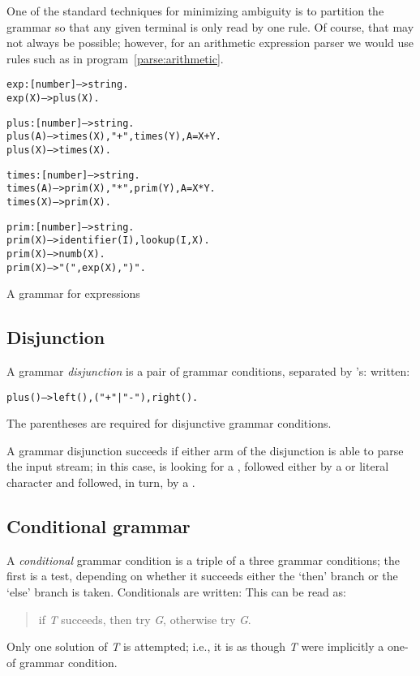 \begin{aside}
One of the standard techniques for minimizing ambiguity is to partition the grammar so that any given terminal is only read by one rule. Of course, that may not always be possible; however, for an arithmetic expression parser we would use rules such as in program~\vref{parse:arithmetic}.
\end{aside}
\begin{program}
\vspace{0.5ex}
\begin{alltt}
exp:[number]-->string.
exp(X) --> plus(X).

plus:[number]-->string.
plus(A) --> times(X), "+", times(Y), A=X+Y.
plus(X) --> times(X).

times:[number]-->string.
times(A) --> prim(X), "*", prim(Y), A=X*Y.
times(X) --> prim(X).

prim:[number]-->string.
prim(X) --> identifier(I), {lookup(I,X)}.
prim(X) --> numb(X).
prim(X) --> "(",exp(X),")".
\end{alltt}
\vspace{-2ex}
\caption{A grammar for expressions}\label{parse:arithmetic}
\end{program}

\subsection{Disjunction}
\label{grammar:disjunction}

A grammar \emph{disjunction} is a pair of grammar conditions, separated by \q{|}'s: written:
\begin{alltt}
plus() --> left(), ("+"|"-"), right().
\end{alltt}
The parentheses are required for disjunctive grammar conditions.

A grammar disjunction succeeds if either arm of the disjunction is able to parse the input stream; in this case,  is looking for a , followed either by a \q{+} or \q{-} literal character and followed, in turn, by a .

\subsection{Conditional grammar}
\label{grammar:conditional}

A \emph{conditional} grammar condition is a triple of a three grammar conditions; the first is a test, depending on whether it succeeds either the `then' branch or the `else' branch is taken.  Conditionals are written:  This can be read as:
\begin{quote}
if \emph{T} succeeds, then try \emph{G}, otherwise try \emph{G}.
\end{quote}
Only one solution of \emph{T} is attempted; i.e., it is as though \emph{T} were implicitly a one-of grammar condition.

